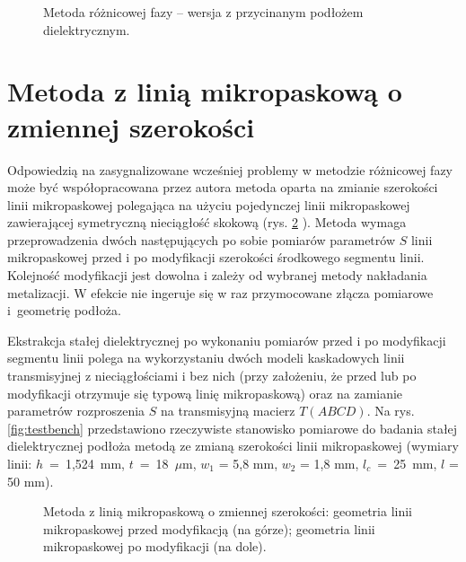   \begin{figure}[tbh!]
    \centerline{}
    \caption{Metoda różnicowej fazy – wersja z przycinanym podłożem dielektrycznym.}
\label{fig:phase_difference_method_other}
\end{figure}

\section[Metoda z linią mikropask. o zmiennej szer.]{Metoda z linią mikropaskową o zmiennej szerokości}

Odpowiedzią na zasygnalizowane wcześniej problemy w metodzie różnicowej fazy może być współopracowana przez autora metoda oparta na zmianie szerokości linii mikropaskowej \cite{cite:line_width_method} polegająca na użyciu pojedynczej linii mikropaskowej zawierającej symetryczną nieciągłość skokową (rys. \ref{fig:microstripe_width_change_schematic} \cite{cite:doktorat}). Metoda wymaga przeprowadzenia dwóch następujących po sobie pomiarów parametrów $S$ linii mikropaskowej przed i po modyfikacji szerokości środkowego segmentu linii. Kolejność modyfikacji jest dowolna i zależy od wybranej metody nakładania metalizacji. W efekcie nie ingeruje się w raz przymocowane złącza pomiarowe i~geometrię podłoża.
\par Ekstrakcja stałej dielektrycznej po wykonaniu pomiarów przed i po modyfikacji segmentu linii polega na wykorzystaniu dwóch modeli kaskadowych linii transmisyjnej z nieciągłościami i bez nich (przy założeniu, że przed lub po modyfikacji otrzymuje się typową linię mikropaskową) oraz na zamianie parametrów rozproszenia $S$ na transmisyjną macierz $T (ABCD)$. Na rys. \ref{fig:testbench} \cite{cite:doktorat} przedstawiono rzeczywiste stanowisko pomiarowe do badania stałej dielektrycznej podłoża metodą ze zmianą szerokości linii mikropaskowej (wymiary linii: $h$~=~1,524~mm, $t$~=~18~$\mu \text{m}$, $w_1$ = 5,8 mm, $w_2$ = 1,8 mm, $l_c$~=~25~mm, $l$ = 50 mm).

\begin{figure}[tbh]
   \centerline{}
    \caption{Metoda z linią mikropaskową o zmiennej szerokości: geometria linii mikropaskowej przed modyfikacją  (na górze); geometria linii mikropaskowej po modyfikacji (na dole).}
\label{fig:microstripe_width_change_schematic}
\end{figure}

